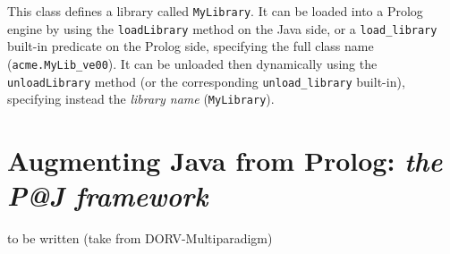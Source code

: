 This class defines a library called \texttt{MyLibrary}.
%
It can be loaded into a Prolog engine by using the
\texttt{loadLibrary} method on the Java side, or a
\texttt{load\_library} built-in predicate on the Prolog side,
specifying the full class name (\texttt{acme.MyLib\_{ve00}}).
%
It can be unloaded then dynamically using the \texttt{unloadLibrary}
method (or the corresponding \texttt{unload\_library} built-in),
specifying instead the \textit{library name} (\texttt{MyLibrary}).

\section{Augmenting Java from Prolog: \textit{the P@J framework}}
\label{sec:p@j}

to be written (take from DORV-Multiparadigm)